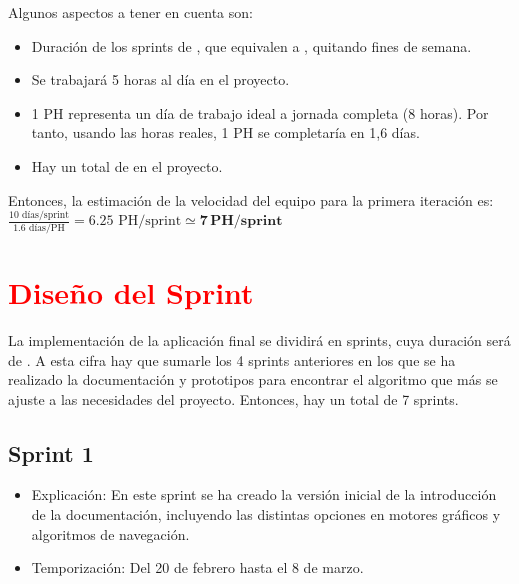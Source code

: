 \bigskip

Algunos aspectos a tener en cuenta son:

\begin{itemize}
    \item Duración de los sprints de \sprintLength, que equivalen a \actualSprintLength, quitando fines de semana.
    \item Se trabajará 5 horas al día en el proyecto.
    \item 1 PH representa un día de trabajo ideal a jornada completa (8 horas). Por tanto, usando las horas reales, 1 PH se completaría en 1,6 días.
    \item Hay un total de \projectph en el proyecto.
\end{itemize}

\bigskip

Entonces, la estimación de la velocidad del equipo para la primera iteración es: $\frac{10 \text{ días/sprint}}{1.6 \text{ días/PH}} = 6.25 \text{ PH/sprint} \simeq \mathbf{7\,PH/sprint}$

\section{\textcolor{red}{Diseño del Sprint}}


La implementación de la aplicación final se dividirá en \sprintNro sprints, cuya duración será de \sprintLength. A esta cifra hay que sumarle los 4 sprints anteriores en los que se ha realizado la documentación y prototipos para encontrar el algoritmo que más se ajuste a las necesidades del proyecto. Entonces, hay un total de 7 sprints.

\subsection{Sprint 1}
\begin{itemize}
    \item Explicación: En este sprint se ha creado la versión inicial de la introducción de la documentación, incluyendo las distintas opciones en motores gráficos y algoritmos de navegación.

    \item Temporización: Del 20 de febrero hasta el 8 de marzo.
\end{itemize}

